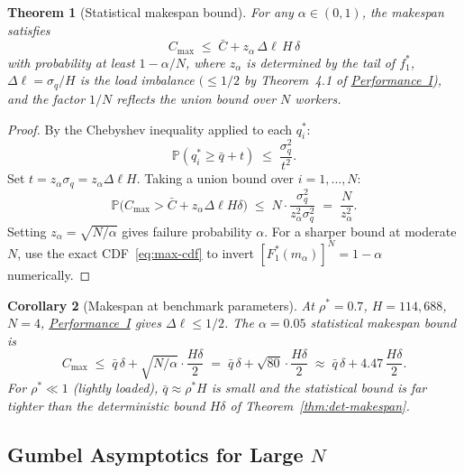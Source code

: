 \documentclass[11pt,a4paper]{article}
\newtheorem{theorem}{Theorem}[section]
\newtheorem{corollary}[theorem]{Corollary}
\newcommand{\rhostar}{\rho^{*}}
\newcommand{\qbar}{\bar{q}}
\newcommand{\Dl}{\Delta\ell}
\newcommand{\Cmax}{C_{\max}}
\newcommand{\Cbar}{\bar{C}}
\newcommand{\sigmaq}{\sigma_q}
\begin{document}
\begin{theorem}[Statistical makespan bound]
\label{thm:stat-makespan}
For any $\alpha \in (0,1)$, the makespan satisfies
\begin{equation}
  \Cmax \;\leq\; \Cbar + z_\alpha\,\Dl\,H\,\delta
  \label{eq:stat-bound}
\end{equation}
with probability at least $1 - \alpha/N$,
where $z_\alpha$ is determined by the tail of $f_1^*$,
$\Dl = \sigmaq/H$ is the load imbalance
$(\leq 1/2$ by Theorem~4.1 of \hyperref[chap:load_balance]{Performance~I}),
and the factor $1/N$ reflects the union bound over $N$ workers.
\end{theorem}

\begin{proof}
By the Chebyshev inequality applied to each $q_i^*$:
\[
  \mathbb{P}(q_i^* \geq \qbar + t) \;\leq\; \frac{\sigmaq^2}{t^2}.
\]
Set $t = z_\alpha \sigmaq = z_\alpha \Dl H$.
Taking a union bound over $i = 1,\ldots, N$:
\[
  \mathbb{P}\!\bigl(\Cmax > \Cbar + z_\alpha \Dl H \delta\bigr)
  \;\leq\;
  N \cdot \frac{\sigmaq^2}{z_\alpha^2 \sigmaq^2}
  \;=\; \frac{N}{z_\alpha^2}.
\]
Setting $z_\alpha = \sqrt{N/\alpha}$ gives failure probability $\alpha$.
For a sharper bound at moderate $N$, use the exact CDF~\eqref{eq:max-cdf}
to invert $[F_1^*(m_\alpha)]^N = 1-\alpha$ numerically.
\end{proof}

\begin{corollary}[Makespan at benchmark parameters]
\label{cor:stat-benchmark}
At $\rhostar = 0.7$, $H = 114{,}688$, $N = 4$,
\hyperref[chap:load_balance]{Performance~I} gives $\Dl \leq 1/2$.
The $\alpha = 0.05$ statistical makespan bound is
\[
  \Cmax \;\leq\; \qbar\,\delta + \sqrt{N/\alpha}\cdot\frac{H\delta}{2}
  \;=\; \qbar\,\delta + \sqrt{80}\cdot\frac{H\delta}{2}
  \;\approx\; \qbar\,\delta + 4.47\,\frac{H\delta}{2}.
\]
For $\rhostar \ll 1$ (lightly loaded), $\qbar \approx \rhostar H$ is small
and the statistical bound is far tighter than the deterministic
bound $H\delta$ of Theorem~\ref{thm:det-makespan}.
\end{corollary}

\subsection{Gumbel Asymptotics for Large $N$}\label{sec:gumbel}
\end{document}

